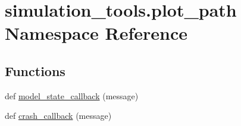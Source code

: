 \hypertarget{namespacesimulation__tools_1_1plot__path}{}\section{simulation\+\_\+tools.\+plot\+\_\+path Namespace Reference}
\label{namespacesimulation__tools_1_1plot__path}
\subsection*{Functions}
\begin{DoxyCompactItemize}
\item 
def \hyperlink{namespacesimulation__tools_1_1plot__path_ace2f5786eaeb63e8e0e629d6bb4e9435}{model\+\_\+state\+\_\+callback} (message)
\item 
def \hyperlink{namespacesimulation__tools_1_1plot__path_a6cc709c2b81ce500bf4b3ffbe5d91f4d}{crash\+\_\+callback} (message)
\end{DoxyCompactItemize}
